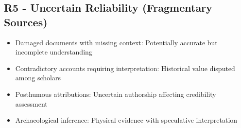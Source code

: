 \subsection{R5 - Uncertain Reliability (Fragmentary
Sources)}\label{r5---uncertain-reliability-fragmentary-sources}

\begin{itemize}
\tightlist
\item
  Damaged documents with missing context: Potentially accurate but
  incomplete understanding
\item
  Contradictory accounts requiring interpretation: Historical value
  disputed among scholars
\item
  Posthumous attributions: Uncertain authorship affecting credibility
  assessment
\item
  Archaeological inference: Physical evidence with speculative
  interpretation
\end{itemize}
